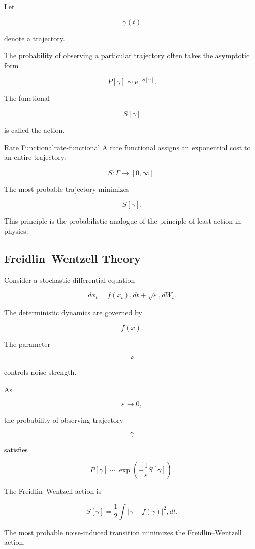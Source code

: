 \documentclass[12pt,twoside,openright]{book}
\begin{document}
Let

\[
\gamma(t)
\]

denote a trajectory.

The probability of observing a particular trajectory often
takes the asymptotic form

\[
P[\gamma]
\sim
e^{-S[\gamma]}.
\]

The functional

\[
S[\gamma]
\]

is called the action.

\begin{definition}{Rate Functional}{rate-functional}
A rate functional assigns an exponential cost to an
entire trajectory:

\[
S:
\Gamma
\rightarrow
[0,\infty].
\]
\end{definition}

The most probable trajectory minimizes

\[
S[\gamma].
\]

This principle is the probabilistic analogue of the
principle of least action in physics.

\subsection{Freidlin--Wentzell Theory}

Consider a stochastic differential equation

\[
dx_t
=
f(x_t),dt
+
\sqrt{\varepsilon},dW_t.
\]

The deterministic dynamics are governed by

\[
f(x).
\]

The parameter

\[
\varepsilon
\]

controls noise strength.

As

\[
\varepsilon
\rightarrow0,
\]

the probability of observing trajectory

\[
\gamma
\]

satisfies

\[
P[\gamma]
\sim
\exp
\left(
-\frac{1}{\varepsilon}
S[\gamma]
\right).
\]

The Freidlin--Wentzell action is

\[
S[\gamma]
=
\frac12
\int
|
\dot\gamma-f(\gamma)
|^2
,dt.
\]

\begin{theorem}
The most probable noise-induced transition minimizes the
Freidlin--Wentzell action.
\end{theorem}
\end{document}
